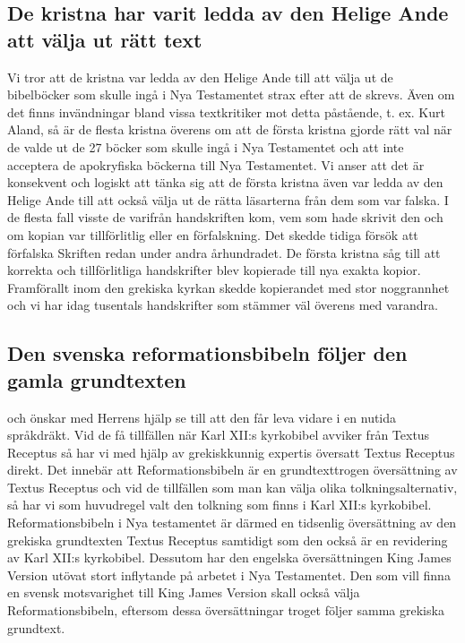 \subsection*{De kristna har varit ledda av den Helige Ande att välja ut rätt text}

Vi tror att de kristna var ledda av den Helige Ande till att välja ut de bibelböcker som skulle ingå i Nya Testamentet strax efter att de skrevs. Även om det finns invändningar bland vissa textkritiker mot detta påstående, t. ex. Kurt Aland, så är de flesta kristna överens om att de första kristna gjorde rätt val när de valde ut de 27 böcker som skulle ingå i Nya Testamentet och att inte acceptera de apokryfiska böckerna till Nya Testamentet. Vi anser att det är konsekvent och logiskt att tänka sig att de första kristna även var ledda av den Helige Ande till att också välja ut de rätta läsarterna från dem som var falska. I de flesta fall visste de varifrån handskriften kom, vem som hade skrivit den och om kopian var tillförlitlig eller en förfalskning. Det skedde tidiga försök att förfalska Skriften redan under andra århundradet. De första kristna såg till att korrekta och tillförlitliga handskrifter blev kopierade till nya exakta kopior. Framförallt inom den grekiska kyrkan skedde kopierandet med stor noggrannhet och vi har idag tusentals handskrifter som stämmer väl överens med varandra.

\subsection*{Den svenska reformationsbibeln följer den gamla grundtexten}

och önskar med Herrens hjälp se till att den får leva vidare i en nutida språkdräkt. Vid de få tillfällen när Karl XII:s kyrkobibel avviker från Textus Receptus så har vi med hjälp av grekiskkunnig expertis översatt Textus Receptus direkt. Det innebär att Reformationsbibeln är en grundtexttrogen översättning av Textus Receptus och vid de tillfällen som man kan välja olika tolkningsalternativ, så har vi som huvudregel valt den tolkning som finns i Karl XII:s kyrkobibel. Reformationsbibeln i Nya testamentet är därmed en tidsenlig översättning av den grekiska grundtexten Textus Receptus samtidigt som den också är en revidering av Karl XII:s kyrkobibel. Dessutom har den engelska översättningen King James Version utövat stort inflytande på arbetet i Nya Testamentet. Den som vill finna en svensk motsvarighet till King James Version skall också välja Reformationsbibeln, eftersom dessa översättningar troget följer samma grekiska grundtext.

